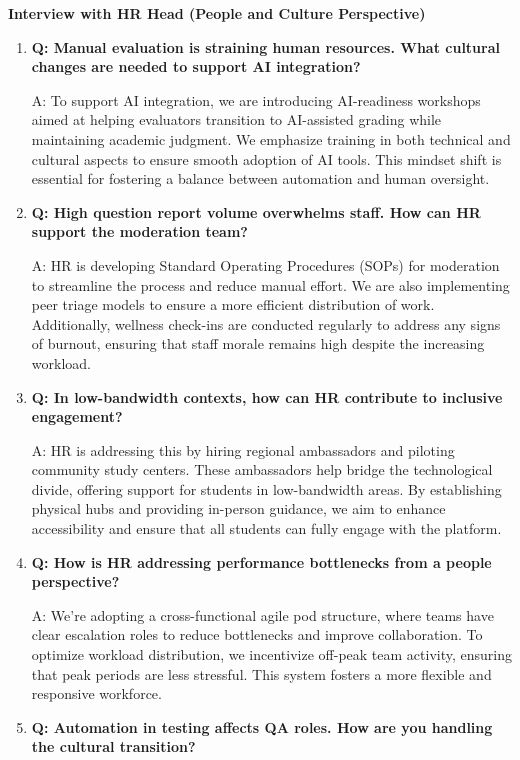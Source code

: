 \documentclass[12pt,a4paper,oneside]{book}
\begin{document}
\textbf{Interview with HR Head (People and Culture Perspective)}

    \begin{enumerate}
\item \textbf{Q: Manual evaluation is straining human resources. What cultural changes are needed to support AI integration?}

A: To support AI integration, we are introducing AI-readiness workshops aimed at helping evaluators transition to AI-assisted grading while maintaining academic judgment. We emphasize training in both technical and cultural aspects to ensure smooth adoption of AI tools. This mindset shift is essential for fostering a balance between automation and human oversight.

\item \textbf{Q: High question report volume overwhelms staff. How can HR support the moderation team?}

A: HR is developing Standard Operating Procedures (SOPs) for moderation to streamline the process and reduce manual effort. We are also implementing peer triage models to ensure a more efficient distribution of work. Additionally, wellness check-ins are conducted regularly to address any signs of burnout, ensuring that staff morale remains high despite the increasing workload.

\item \textbf{Q: In low-bandwidth contexts, how can HR contribute to inclusive engagement?}

A: HR is addressing this by hiring regional ambassadors and piloting community study centers. These ambassadors help bridge the technological divide, offering support for students in low-bandwidth areas. By establishing physical hubs and providing in-person guidance, we aim to enhance accessibility and ensure that all students can fully engage with the platform.

\item \textbf{Q: How is HR addressing performance bottlenecks from a people perspective?} 

A: We’re adopting a cross-functional agile pod structure, where teams have clear escalation roles to reduce bottlenecks and improve collaboration. To optimize workload distribution, we incentivize off-peak team activity, ensuring that peak periods are less stressful. This system fosters a more flexible and responsive workforce.

\item \textbf{Q: Automation in testing affects QA roles. How are you handling the cultural transition?} 


\end{enumerate}
\end{document}
